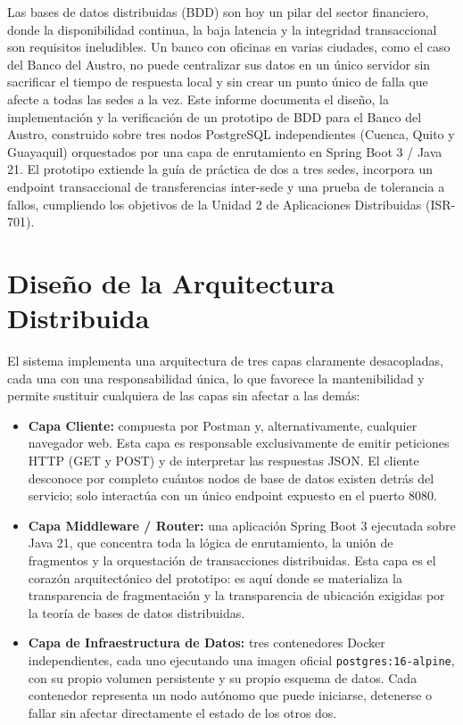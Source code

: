 \documentclass[11pt,a4paper]{article}
\begin{document}
Las bases de datos distribuidas (BDD) son hoy un pilar del sector financiero, donde la disponibilidad continua, la baja latencia y la integridad transaccional son requisitos ineludibles. Un banco con oficinas en varias ciudades, como el caso del Banco del Austro, no puede centralizar sus datos en un único servidor sin sacrificar el tiempo de respuesta local y sin crear un punto único de falla que afecte a todas las sedes a la vez.
Este informe documenta el diseño, la implementación y la verificación de un prototipo de BDD para el Banco del Austro, construido sobre tres nodos PostgreSQL independientes (Cuenca, Quito y Guayaquil) orquestados por una capa de enrutamiento en Spring Boot 3 / Java 21. El prototipo extiende la guía de práctica de dos a tres sedes, incorpora un endpoint transaccional de transferencias inter-sede y una prueba de tolerancia a fallos, cumpliendo los objetivos de la Unidad 2 de Aplicaciones Distribuidas (ISR-701).

\section{Diseño de la Arquitectura Distribuida}

El sistema implementa una arquitectura de tres capas claramente desacopladas, cada una con una responsabilidad única, lo que favorece la mantenibilidad y permite sustituir cualquiera de las capas sin afectar a las demás:

\begin{itemize}[leftmargin=1.2em]
  \item \textbf{Capa Cliente:} compuesta por Postman y, alternativamente, cualquier navegador web. Esta capa es responsable exclusivamente de emitir peticiones HTTP (GET y POST) y de interpretar las respuestas JSON. El cliente desconoce por completo cuántos nodos de base de datos existen detrás del servicio; solo interactúa con un único endpoint expuesto en el puerto 8080.
  \item \textbf{Capa Middleware / Router:} una aplicación Spring Boot 3 ejecutada sobre Java 21, que concentra toda la lógica de enrutamiento, la unión de fragmentos y la orquestación de transacciones distribuidas. Esta capa es el corazón arquitectónico del prototipo: es aquí donde se materializa la transparencia de fragmentación y la transparencia de ubicación exigidas por la teoría de bases de datos distribuidas.
  \item \textbf{Capa de Infraestructura de Datos:} tres contenedores Docker independientes, cada uno ejecutando una imagen oficial \texttt{postgres:16-alpine}, con su propio volumen persistente y su propio esquema de datos. Cada contenedor representa un nodo autónomo que puede iniciarse, detenerse o fallar sin afectar directamente el estado de los otros dos.
\end{itemize}
\end{document}
